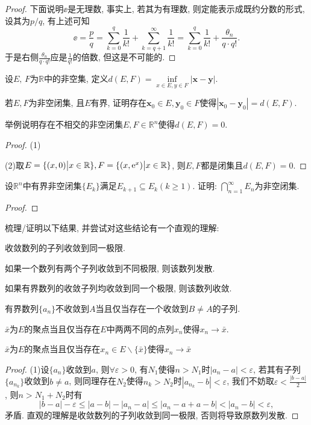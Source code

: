 \begin{quiza}
\begin{proof}
下面说明\(\ee\)是无理数, 事实上, 若其为有理数, 则定能表示成既约分数的形式, 设其为\(p/q\), 有上述可知\[\ee=\frac{p}{q}=\sum_{k=0}^{q}\frac{1}{k!}+\sum_{k=q+1}^{\infty}\frac{1}{k!}=\sum_{k=0}^{q}\frac{1}{k!}+\frac{\theta_n}{q\cdot q!}.\]于是右侧\(\frac{\theta_n}{q\cdot q!}\)应是\(\frac{1}{q!}\)的倍数, 但这是不可能的.
\end{proof}
\woe 设\(E,\,F\)为\(\mathbb{R}\)中的非空集, 定义\(d(E,F)=\underset{x\in E,y\in F}{\inf}|\boldsymbol{x}-\boldsymbol{y}|.\)
\begin{quizs}
      \item 若\(E,F\)为非空闭集, 且\(E\)有界, 证明存在\(\boldsymbol{x}_0\in E,\boldsymbol{y}_0\in F\)使得\(|\boldsymbol{x}_0-\boldsymbol{y}_0|=d(E,F)\).
      \item 举例说明存在不相交的非空闭集\(E,F\in \mathbb{R}^n\)使得\(d(E,F)=0\).
\end{quizs}
\begin{proof}
(1)

(2)取\(E=\{(x,0)\big| x\in\mathbb{R}\},F=\{(x,\mathrm{e}^x)\big|x\in\mathbb{R}\}\), 则\(E,F\)都是闭集且\(d(E,F)=0\).
\end{proof}
\woe 设\(\mathbb{R}^n\)中有界非空闭集\(\{E_k\}\)满足\(E_{k+1}\subseteq E_{k}(k\geqslant 1)\). 证明: \(\bigcap_{n=1}^\infty E_n\)为非空闭集.
\begin{proof}

\end{proof}
\woestar 梳理/证明以下结果, 并尝试对这些结论有一个直观的理解:
\begin{quizcs}
\item 收敛数列的子列收敛到同一极限.
\item 如果一个数列有两个子列收敛到不同极限, 则该数列发散.
\item 如果有界数列的收敛子列均收敛到同一个极限, 则该数列收敛.
\item 有界数列\(\{a_n\}\)不收敛到\(A\)当且仅当存在一个收敛到\(B\ne A\)的子列.
\item \(\bar{x}\)为\(E\)的聚点当且仅当存在\(E\)中两两不同的点列\(x_n\)使得\(x_n\rightarrow \bar{x}\).
\item \(\bar{x}\)为\(E\)的聚点当且仅当存在\(x_n\in E\backslash\{\bar{x}\}\)使得\(x_n\rightarrow \bar{x}\)
\end{quizcs}
\begin{proof}
	(1)设\(\{a_n\}\)收敛到\(a\), 则\(\forall\varepsilon>0\), 有\(N_1\)使得\(n>N_1\)时\(|a_n-a|<\varepsilon\),	若其有子列\(\{a_{n_k}\}\)收敛到\(b\ne a\), 则同理存在\(N_2\)使得\(n_k>N_2\)时\(|a_{n_k}-b|<\varepsilon\), 我们不妨取\(\varepsilon<\frac{|b-a|}{2}\), 则\(n>N_1+N_2\)时有\[|b-a|-\varepsilon\leqslant|a-b|-|a_n-a|\leqslant|a_n-a+a-b|<|a_n-b|<\varepsilon,\]矛盾. 直观的理解是收敛数列的子列收敛到同一极限, 否则将导致原数列发散.
	

\end{proof}
\end{quiza}
